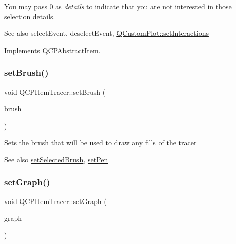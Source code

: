 You may pass 0 as {\itshape details} to indicate that you are not interested in those selection details.

\begin{DoxySeeAlso}{See also}
select\+Event, deselect\+Event, \mbox{\hyperlink{class_q_custom_plot_a5ee1e2f6ae27419deca53e75907c27e5}{Q\+Custom\+Plot\+::set\+Interactions}} 
\end{DoxySeeAlso}


Implements \mbox{\hyperlink{class_q_c_p_abstract_item_a96d522d10ffc0413b9a366c6f7f0476b}{Q\+C\+P\+Abstract\+Item}}.

\mbox{\label{class_q_c_p_item_tracer_a2c303f7470a30084daa201ed556b3c36}} 
\subsubsection{\texorpdfstring{set\+Brush()}{setBrush()}}
{\footnotesize\ttfamily void Q\+C\+P\+Item\+Tracer\+::set\+Brush (\begin{DoxyParamCaption}\item[{const Q\+Brush \&}]{brush }\end{DoxyParamCaption})}

Sets the brush that will be used to draw any fills of the tracer

\begin{DoxySeeAlso}{See also}
\mbox{\hyperlink{class_q_c_p_item_tracer_a0f55c084980a7a312af859d3e7b558ef}{set\+Selected\+Brush}}, \mbox{\hyperlink{class_q_c_p_item_tracer_af8048636fc1ef0152e51809b008df2ca}{set\+Pen}} 
\end{DoxySeeAlso}
\mbox{\label{class_q_c_p_item_tracer_af5886f4ded8dd68cb4f3388f390790c0}} 
\subsubsection{\texorpdfstring{set\+Graph()}{setGraph()}}
{\footnotesize\ttfamily void Q\+C\+P\+Item\+Tracer\+::set\+Graph (\begin{DoxyParamCaption}\item[{\mbox{\hyperlink{class_q_c_p_graph}{Q\+C\+P\+Graph}} $\ast$}]{graph }\end{DoxyParamCaption})}

